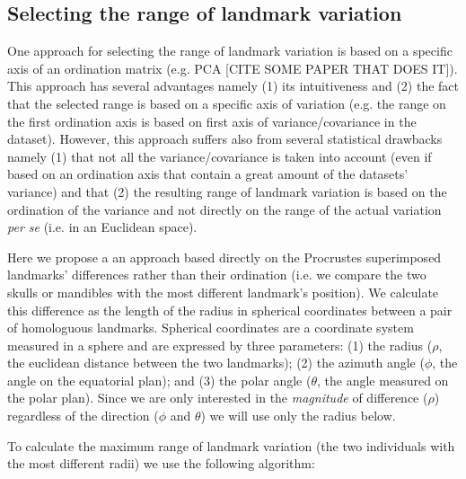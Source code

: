 \documentclass[a4paper,11pt]{article}
\begin{document}
\subsection{Selecting the range of landmark variation}

One approach for selecting the range of landmark variation is based on a specific axis of an ordination matrix (e.g. PCA [CITE SOME PAPER THAT DOES IT]).
This approach has several advantages namely (1) its intuitiveness and (2) the fact that the selected range is based on a specific axis of variation (e.g. the range on the first ordination axis is based on first axis of variance/covariance in the dataset).
However, this approach suffers also from several statistical drawbacks namely (1) that not all the variance/covariance is taken into account (even if based on an ordination axis that contain a great amount of the datasets' variance) and that (2) the resulting range of landmark variation is based on the ordination of the variance and not directly on the range of the actual variation \textit{per se} (i.e. in an Euclidean space).

Here we propose a an approach based directly on the Procrustes superimposed landmarks' differences rather than their ordination (i.e. we compare the two skulls or mandibles with the most different landmark's position).
We calculate this difference as the length of the radius in spherical coordinates between a pair of homologuous landmarks.
Spherical coordinates are a coordinate system measured in a sphere and are expressed by three parameters: (1) the radius ($\rho$, the euclidean distance between the two landmarks); (2) the azimuth angle ($\phi$, the angle on the equatorial plan); and (3) the polar angle ($\theta$, the angle measured on the polar plan).
Since we are only interested in the \textit{magnitude} of difference ($\rho$) regardless of the direction ($\phi$ and $\theta$) we will use only the radius below.

To calculate the maximum range of landmark variation (the two individuals with the most different radii) we use the following algorithm:
\end{document}
